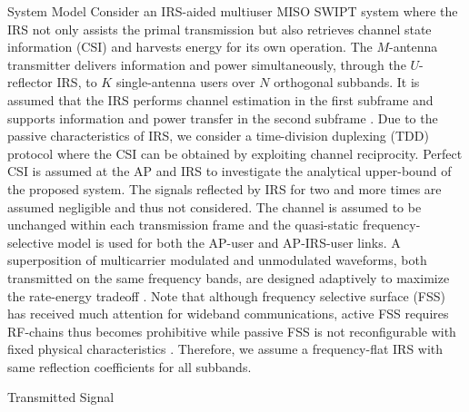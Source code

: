 \documentclass{IEEEtran}
\begin{document}
\begin{section} {System Model}
	Consider an IRS-aided multiuser MISO SWIPT system where the IRS not only assists the primal transmission but also retrieves channel state information (CSI) and harvests energy for its own operation. The $M$-antenna transmitter delivers information and power simultaneously, through the $U$-reflector IRS, to $K$ single-antenna users over $N$ orthogonal subbands. It is assumed that the IRS performs channel estimation in the first subframe and supports information and power transfer in the second subframe \cite{Zheng2019}. Due to the passive characteristics of IRS, we consider a time-division duplexing (TDD) protocol where the CSI can be obtained by exploiting channel reciprocity. Perfect CSI is assumed at the AP and IRS to investigate the analytical upper-bound of the proposed system. The signals reflected by IRS for two and more times are assumed negligible and thus not considered. The channel is assumed to be unchanged within each transmission frame and the quasi-static frequency-selective model is used for both the AP-user and AP-IRS-user links. A superposition of multicarrier modulated and unmodulated waveforms, both transmitted on the same frequency bands, are designed adaptively to maximize the rate-energy tradeoff \cite{Clerckx2018b}. Note that although frequency selective surface (FSS) has received much attention for wideband communications, active FSS requires RF-chains thus becomes prohibitive while passive FSS is not reconfigurable with fixed physical characteristics \cite{Kim2006,Xu2014,Anwar2018}. Therefore, we assume a frequency-flat IRS with same reflection coefficients for all subbands.

	\begin{subsection} {Transmitted Signal}


\end{subsection}
\end{section}
\end{document}
